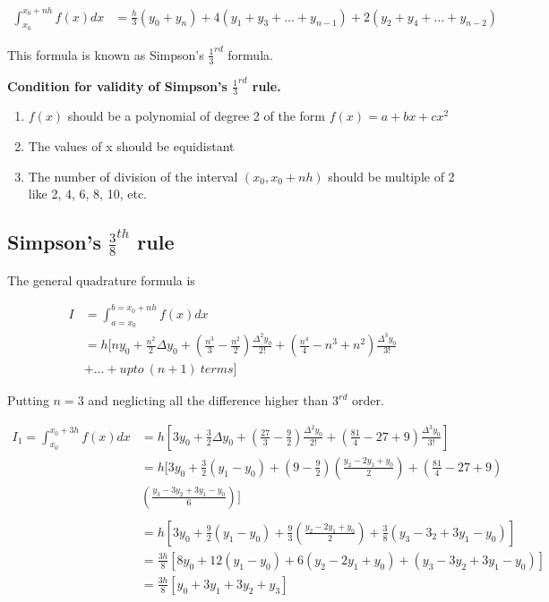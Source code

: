 \documentclass[11pt, a4paper, oneside]{book}
\begin{document}
          \begin{align*}
            \int_{x_0}^{x_0+nh}f(x)dx &= \frac{h}{3}(y_0+y_n)+4(y_1+y_3+\dots+y_{n-1})+2(y_2+y_4+\dots+y_{n-2})
          \end{align*}

          This formula is known as Simpson's $\frac{1}{3}^{rd}$ formula.

          \textbf{Condition for validity of Simpson's $\frac{1}{3}^{rd}$ rule.}

          \begin{enumerate}
            \item $f(x)$ should be a polynomial of degree 2 of the form $f(x)=a+bx+cx^2$
            \item The values of x should be equidistant
            \item The number of division of the interval $(x_0,x_0+nh)$ should be multiple of 2 like 2, 4, 6, 8, 10, etc.
          \end{enumerate}

        \subsection{Simpson's $\frac{3}{8}^{th}$ rule}
          The general quadrature formula is

          \begin{align*}
            I &=\int_{a=x_0}^{b=x_0+nh}f(x)dx\\
              &= h[ny_0+\frac{n^2}{2}\Delta y_0+(\frac{n^3}{3}-\frac{n^2}{2})\frac{\Delta^2y_0}{2!}+(\frac{n^4}{4}-n^3+n^2)\frac{\Delta^3y_0}{3!}\\
              &+ \dots+upto\ (n+1)\ terms]
          \end{align*}

          Putting $n=3$ and neglicting all the difference higher than $3^{rd}$ order.

          \begin{align*}
            I_1=\int_{x_0}^{x_0+3h}f(x)dx &= h[3y_0+\frac{3}{2}\Delta y_0+(\frac{27}{3}-\frac{9}{2})\frac{\Delta^2y_0}{2!}+(\frac{81}{4}-27+9)\frac{\Delta^3y_0}{3!}]\\
                                    &= h[3y_0+\frac{3}{2}(y_1-y_0)+(9-\frac{9}{2})(\frac{y_2-2y_1+y_0}{2})+(\frac{81}{4}-27+9)\\
                                    &  (\frac{y_3-3y_2+3y_1-y_0}{6})]\\
                                    \ \\
                                    &= h[3y_0+\frac{9}{2}(y_1-y_0)+\frac{9}{3}(\frac{y_2-2y_1+y_0}{2})+\frac{3}{8}(y_3-3_2+3y_1-y_0)]\\
                                    &= \frac{3h}{8}[8y_0+12(y_1-y_0)+6(y_2-2y_1+y_0)+(y_3-3y_2+3y_1-y_0)]\\
                                    &= \frac{3h}{8}[y_0+3y_1+3y_2+y_3]\\
          \end{align*}
\end{document}
